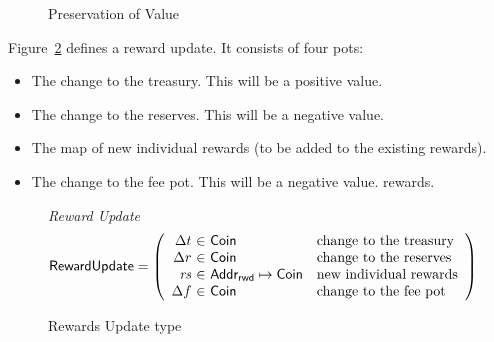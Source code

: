 \begin{figure}[htb]
  \begin{center}
  \end{center}
  \caption{Preservation of Value}
  \label{fig:fund-preservation}
\end{figure}

Figure~\ref{fig:defs:reward-update} defines a reward update.
It consists of four pots:
\begin{itemize}
  \item The change to the treasury. This will be a positive value.
  \item The change to the reserves. This will be a negative value.
  \item The map of new individual rewards (to be added to the existing rewards).
  \item The change to the fee pot. This will be a negative value.
    rewards.
\end{itemize}

\begin{figure}[htb]
  \emph{Reward Update}
  \begin{equation*}
    \RewardUpdate =
    \left(
      \begin{array}{r@{~\in~}ll}
        \Delta t & \Coin & \text{change to the treasury} \\
        \Delta r & \Coin & \text{change to the reserves} \\
        \var{rs} & \AddrRWD\mapsto\Coin & \text{new individual rewards} \\
        \Delta f & \Coin & \text{change to the fee pot} \\
      \end{array}
    \right)
  \end{equation*}
  \caption{Rewards Update type}
  \label{fig:defs:reward-update}
\end{figure}

